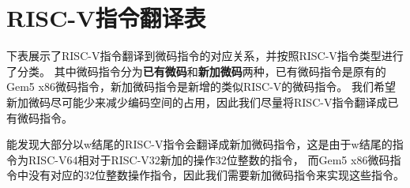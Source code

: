 \chapter{RISC-V指令翻译表}

下表展示了RISC-V指令翻译到微码指令的对应关系，并按照RISC-V指令类型进行了分类。
其中微码指令分为\textbf{已有微码}和\textbf{新加微码}两种，已有微码指令是原有的Gem5 x86微码指令，新加微码指令是新增的类似RISC-V的微码指令。
我们希望新加微码尽可能少来减少编码空间的占用，因此我们尽量将RISC-V指令翻译成已有微码指令。

能发现大部分以w结尾的RISC-V指令会翻译成新加微码指令，这是由于w结尾的指令为RISC-V64相对于RISC-V32新加的操作32位整数的指令，
而Gem5 x86微码指令中没有对应的32位整数操作指令，因此我们需要新加微码指令来实现这些指令。




% 